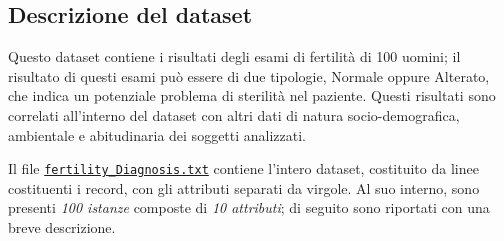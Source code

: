 \documentclass[a4paper,11pt,twoside,notitlepage,final]{scrartcl}
\begin{document}

\subsection{Descrizione del dataset}

Questo dataset contiene i risultati degli esami di fertilità di 100 uomini;
il risultato di questi esami può essere di due tipologie, Normale oppure Alterato, che indica un potenziale problema di sterilità nel paziente.
Questi risultati sono correlati all'interno del dataset con altri dati di natura socio-demografica, ambientale e abitudinaria dei soggetti analizzati.

Il file \href{http://archive.ics.uci.edu/ml/machine-learning-databases/00244/fertility_Diagnosis.txt}{\texttt{fertility\_Diagnosis.txt}}
contiene l'intero dataset, costituito da linee costituenti i record, con gli attributi separati da virgole.
Al suo interno, sono presenti \emph{100 istanze} composte di \emph{10 attributi};
di seguito sono riportati con una breve descrizione.
\end{document}
